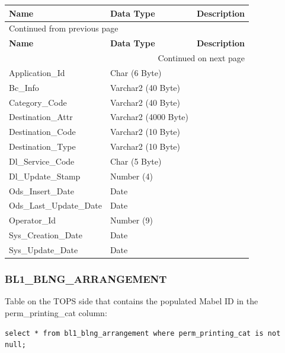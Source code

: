 \documentclass[12pt,twoside]{article}
\begin{document}
\begin{longtable}{l|l|l}
\hline
\textbf{Name} & \textbf{Data Type} & \textbf{Description}\\
\hline
\endfirsthead
\multicolumn{3}{l}{Continued from previous page} \\
\hline

\textbf{Name} & \textbf{Data Type} & \textbf{Description} \\

\hline
\endhead
\hline\multicolumn{3}{r}{Continued on next page} \\
\endfoot
\endlastfoot
\hline
Application\_Id & Char (6 Byte) & \\
Bc\_Info & Varchar2 (40 Byte) & \\
Category\_Code & Varchar2 (40 Byte) & \\
Destination\_Attr & Varchar2 (4000 Byte) & \\
Destination\_Code & Varchar2 (10 Byte) & \\
Destination\_Type & Varchar2 (10 Byte) & \\
Dl\_Service\_Code & Char (5 Byte) & \\
Dl\_Update\_Stamp & Number (4) & \\
Ods\_Insert\_Date & Date & \\
Ods\_Last\_Update\_Date & Date & \\
Operator\_Id & Number (9) & \\
Sys\_Creation\_Date & Date & \\
Sys\_Update\_Date & Date & \\
\hline
\end{longtable}

\normalsize

\subsubsection{BL1\_BLNG\_ARRANGEMENT}
\label{sec:orgheadline150}
Table on the TOPS side that contains the populated Mabel ID in the perm\_printing\_cat column:
\begin{verbatim}
select * from bl1_blng_arrangement where perm_printing_cat is not null;
\end{verbatim}
\end{document}
